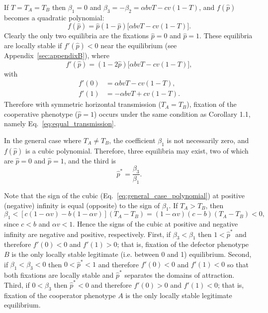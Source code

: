 \documentclass[12pt]{extarticle}
\begin{document}
{If $T=T_A=T_B$ then $\beta_1=0$ and $\beta_3=-\beta_2=\alpha b vT -cv(1-T)$, 
and $f(\hat{p})$ becomes a quadratic polynomial:
\begin{equation} \label{eq:equal_horizontal_transmission}
  f(\hat{p}) = \hat{p}(1-\hat{p})\big[\alpha bvT - cv(1-T)\big].
\end{equation}
Clearly the only two equilibria are the fixations  $\hat{p} =  0$ and $\hat{p} = 1$.
These equilibria are locally stable if $f'(\hat{p})<0$ near the equilibrium (see Appendix~\autoref{sec:appendixB}), where
\begin{equation}
f'(\hat{p})=(1-2\hat{p})\big[\alpha bvT - cv(1-T)\big],
\end{equation}
with
\begin{equation} \label{eq:derivative_of_phattag-phat}
\begin{aligned}
	f'(0) &=	\alpha bvT - cv(1-T), \\
	f'(1) &=	-\alpha bvT + cv(1-T).
\end{aligned}
\end{equation}
Therefore with symmetric horizontal transmission ($T_A=T_B$), fixation of the cooperative phenotype ($\hat{p}=1$) occurs under the same condition as Corollary 1.1, namely Eq.\ \ref{eq:equal_transmission}.


In the general case where $T_A \neq T_B$, the coefficient $\beta_1$ is not necessarily zero, and $f(\hat{p})$ is a cubic polynomial.
Therefore, three equilibria may exist, two of which are
$\hat{p} = 0 $ and $\hat{p} = 1$, and the third is
\begin{equation} \label{eq:oblique_and_vertic_result}
  \hat{p}^* =  
  \frac{\beta_3}{\beta_1}.
\end{equation}

Note that the sign of the  cubic (Eq.\ \ref{eq:general_case_polynomial}) at positive (negative) infinity is equal (opposite) to the sign of $\beta_1$. 
If $T_A>T_B$, then 
\begin{equation} \label{eq:beta1}
   \beta_1 < [c(1-\alpha v) - b(1-\alpha v)] (T_A-T_B) 
   = (1-\alpha v)(c-b)(T_A-T_B) < 0 ,
 \end{equation}
since $c<b$ and $\alpha v < 1$. Hence the signs of the cubic at positive and negative infinity are negative and positive, respectively.
First, if $\beta_3<\beta_1$ then 
$1<\hat{p}^*$ and therefore $f'(0)<0$ and $f'(1)>0$; that is, fixation of the defector phenotype $B$ is the only locally stable legitimate (i.e. between 0 and 1) equilibrium.
Second, if $\beta_1<\beta_3<0$ then 
$0<\hat{p}^*<1$ and therefore $f'(0)<0$ and $f'(1)<0$ so that both fixations are locally stable and $\hat{p}^*$ separates the domains of attraction.
Third, if $0<\beta_3$ then 
$\hat{p}^*<0$ and therefore $f'(0)>0$ and $f'(1)<0$; that is, fixation of the cooperator phenotype $A$ is the only locally stable legitimate equilibrium.

}
\end{document}
